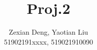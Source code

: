 \documentclass[conference]{IEEEtran}
\begin{document}
\title{Proj.2}

\author{Zexian Deng, Yaotian Liu \\  51902191xxxx, 519021910090}
\date{}

\maketitle



\printbibliography
\end{document}
